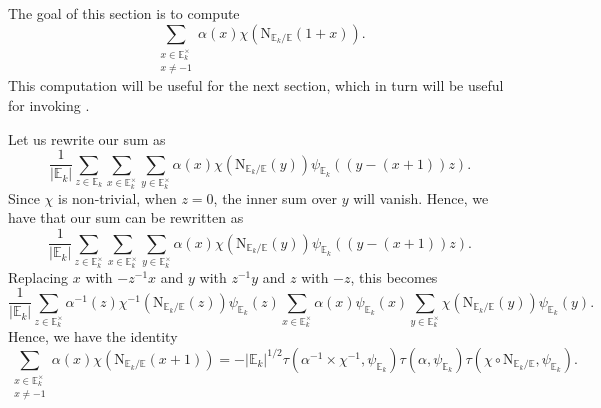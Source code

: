 \documentclass[12pt, reqno]{amsart}
\theoremstyle{definition}
\theoremstyle{definition}
\theoremstyle{definition}
\newcommand{\multiplicativegroup}[1]{#1^{\times}}
\newcommand{\sizeof}[1]{\left|#1\right|}
\newcommand{\fieldCharacter}{\psi}
\newcommand{\aFieldNorm}{\mathrm{N}}
\newcommand{\quadraticExtension}{\mathbb{E}}
\newcommand{\quadraticFieldExtension}[1]{\quadraticExtension_{#1}}
\newcommand{\GaussSumCharacter}[3]{\tau\left(#1 \times #2, #3\right)}
\begin{document}
The goal of this section is to compute $$\sum_{\substack{x \in \multiplicativegroup{\quadraticFieldExtension{k}}\\
x \ne -1}} \alpha\left(x\right) \chi\left(\aFieldNorm_{\quadraticFieldExtension{k} \slash \quadraticExtension}\left(1+x\right)\right).$$
This computation will be useful for the next section, which in turn will be useful for invoking .

Let us rewrite our sum as
$$\frac{1}{\sizeof{\quadraticFieldExtension{k}}} \sum_{z \in \quadraticFieldExtension{k}} \sum_{x \in  \multiplicativegroup{\quadraticFieldExtension{k}}} \sum_{y \in \multiplicativegroup{\quadraticFieldExtension{k}}}\alpha\left(x\right) \chi\left(\aFieldNorm_{\quadraticFieldExtension{k} \slash \quadraticExtension}\left(y\right)\right) \fieldCharacter_{\quadraticFieldExtension{k}}\left(\left(y - \left(x + 1\right)\right)z\right).$$
Since $\chi$ is non-trivial, when $z = 0$, the inner sum over $y$ will vanish. Hence, we have that our sum can be rewritten as
$$\frac{1}{\sizeof{\quadraticFieldExtension{k}}} \sum_{z \in \multiplicativegroup{\quadraticFieldExtension{k}}} \sum_{x \in  \multiplicativegroup{\quadraticFieldExtension{k}}} \sum_{y \in \multiplicativegroup{\quadraticFieldExtension{k}}}\alpha\left(x\right) \chi\left(\aFieldNorm_{\quadraticFieldExtension{k} \slash \quadraticExtension}\left(y\right)\right) \fieldCharacter_{\quadraticFieldExtension{k}}\left(\left(y - \left(x + 1\right)\right)z\right).$$
Replacing $x$ with $-z^{-1} x$ and $y$ with $z^{-1} y$ and $z$ with $-z$, this becomes
$$\frac{1}{\sizeof{\quadraticFieldExtension{k}}} \sum_{z \in \multiplicativegroup{\quadraticFieldExtension{k}}} \alpha^{-1}\left(z\right) \chi^{-1}\left(\aFieldNorm_{\quadraticFieldExtension{k} \slash \quadraticExtension}\left(z\right)\right) \fieldCharacter_{\quadraticFieldExtension{k}}\left(z\right) \sum_{x \in  \multiplicativegroup{\quadraticFieldExtension{k}}} \alpha\left(x\right) \fieldCharacter_{\quadraticFieldExtension{k}}\left(x\right) \sum_{y \in \multiplicativegroup{\quadraticFieldExtension{k}}} \chi\left(\aFieldNorm_{\quadraticFieldExtension{k} \slash \quadraticExtension}\left(y\right)\right) \fieldCharacter_{\quadraticFieldExtension{k}}\left(y\right).$$
Hence, we have the identity
$$\sum_{\substack{x \in \multiplicativegroup{\quadraticFieldExtension{k}}\\
x \ne -1}} \alpha\left(x\right) \chi\left(\aFieldNorm_{\quadraticFieldExtension{k} \slash \quadraticExtension}\left(x+1\right)\right) = -\sizeof{\quadraticFieldExtension{k}}^{1/2} \GaussSumCharacter{\alpha^{-1}}{\chi^{-1}}{\fieldCharacter_{\quadraticFieldExtension{k}}} \tau\left(\alpha, \fieldCharacter_{\quadraticFieldExtension{k}}\right) \tau\left(\chi \circ \aFieldNorm_{\quadraticFieldExtension{k} \slash \quadraticExtension}, \fieldCharacter_{\quadraticFieldExtension{k}}\right).$$
\end{document}
